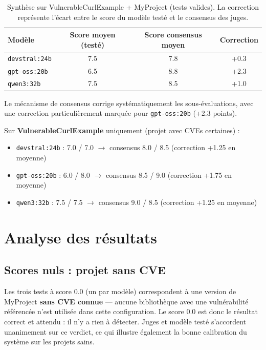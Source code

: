 \documentclass[a4paper, 12pt, hidelinks]{article}
\begin{document}
\begin{table}[H]
  \centering
  \begin{tabularx}{\textwidth}{l c c c}
    \toprule
    \textbf{Modèle} & \textbf{Score moyen (testé)} & \textbf{Score consensus moyen} & \textbf{Correction} \\
    \midrule
    \texttt{devstral:24b} & 7.5  & 7.8 & +0.3 \\
    \texttt{gpt-oss:20b}  & 6.5  & 8.8 & +2.3 \\
    \texttt{qwen3:32b}    & 7.5  & 8.5 & +1.0 \\
    \bottomrule
  \end{tabularx}
  \caption{Synthèse sur VulnerableCurlExample + MyProject (tests valides). La correction représente l'écart entre le score du modèle testé et le consensus des juges.}
\end{table}

Le mécanisme de consensus corrige systématiquement les sous-évaluations, avec une correction particulièrement marquée pour \texttt{gpt-oss:20b} (+2.3 points).

Sur \textbf{VulnerableCurlExample} uniquement (projet avec CVEs certaines) :
\begin{itemize}
  \item \texttt{devstral:24b} : 7.0 / 7.0 $\rightarrow$ consensus 8.0 / 8.5 (correction +1.25 en moyenne)
  \item \texttt{gpt-oss:20b} : 6.0 / 8.0 $\rightarrow$ consensus 8.5 / 9.0 (correction +1.75 en moyenne)
  \item \texttt{qwen3:32b} : 7.5 / 7.5 $\rightarrow$ consensus 9.0 / 8.5 (correction +1.25 en moyenne)
\end{itemize}

\section{Analyse des résultats}

\subsection*{Scores nuls : projet sans CVE}

Les trois tests à score 0.0 (un par modèle) correspondent à une version de MyProject \textbf{sans CVE connue} — aucune bibliothèque avec une vulnérabilité référencée n'est utilisée dans cette configuration. Le score 0.0 est donc le résultat correct et attendu : il n'y a rien à détecter. Juges et modèle testé s'accordent unanimement sur ce verdict, ce qui illustre également la bonne calibration du système sur les projets sains.
\end{document}
